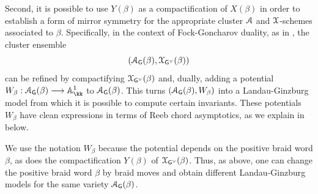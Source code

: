 Second, it is possible to use $Y(\beta)$ as a compactification of $X(\beta)$ in order to establish a form of mirror symmetry for the appropriate cluster $\mathcal{A}$ and $\mathcal{X}$-schemes associated to $\beta$. Specifically, in the context of Fock-Goncharov duality, as in , the cluster ensemble
$$(\mathcal{A}_{\mathsf{G}}(\beta),\mathcal{X}_{\mathsf{G}^\vee}(\beta))$$
can be refined by compactifying $\mathcal{X}_{\mathsf{G}^\vee}(\beta)$ and, dually, adding a potential $W_\beta:\SA_\G(\beta)\lr\mathbb{A}^1_\kk$ to $\mathcal{A}_{\mathsf{G}}(\beta)$. This turns $(\mathcal{A}_{\mathsf{G}}(\beta),W_\beta)$ into a Landau-Ginzburg model from which it is possible to compute certain invariants. These potentials $W_\beta$ have clean expressions in terms of Reeb chord asymptotics, as we explain in  below.

\begin{remark} We use the notation $W_\beta$ because the potential depends on the positive braid word $\beta$, as does the compactification $Y(\beta)$ of $\mathcal{X}_{\mathsf{G}^\vee}(\beta)$. Thus, as above, one can change the positive braid word $\beta$ by braid moves and obtain different Landau-Ginzburg models for the same variety $\mathcal{A}_{\mathsf{G}}(\beta)$.\sbs
\end{remark}
